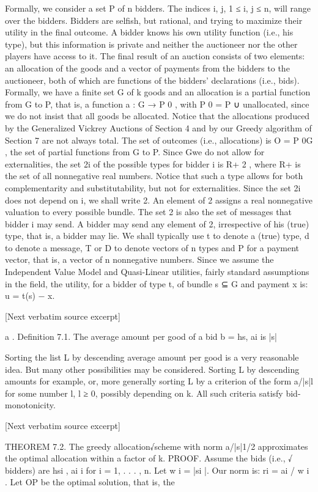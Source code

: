 \documentclass[10pt]{article}
\begin{document}
\begin{ReviewVerbatim}
Formally, we consider a set P of n bidders. The indices i, j, 1 ≤ i, j ≤ n, will
range over the bidders. Bidders are selfish, but rational, and trying to maximize their
utility in the final outcome. A bidder knows his own utility function (i.e., his type),
but this information is private and neither the auctioneer nor the other players have
access to it. The final result of an auction consists of two elements: an allocation
of the goods and a vector of payments from the bidders to the auctioneer, both of
which are functions of the bidders’ declarations (i.e., bids). Formally, we have a
finite set G of k goods and an allocation is a partial function from G to P, that is, a
function a : G → P 0 , with P 0 = P ∪ {unallocated}, since we do not insist that all
goods be allocated. Notice that the allocations produced by the Generalized Vickrey
Auctions of Section 4 and by our Greedy algorithm of Section 7 are not always
total. The set of outcomes (i.e., allocations) is O = P 0G , the set of partial functions
from G to P. Since Gwe do not allow for externalities, the set 2i of the possible types
for bidder i is R+ 2 , where R+ is the set of all nonnegative real numbers. Notice
that such a type allows for both complementarity and substitutability, but not for
externalities. Since the set 2i does not depend on i, we shall write 2. An element
of 2 assigns a real nonnegative valuation to every possible bundle. The set 2 is
also the set of messages that bidder i may send. A bidder may send any element of
2, irrespective of his (true) type, that is, a bidder may lie. We shall typically use t
to denote a (true) type, d to denote a message, T or D to denote vectors of n types
and P for a payment vector, that is, a vector of n nonnegative numbers.
Since we assume the Independent Value Model and Quasi-Linear utilities, fairly
standard assumptions in the field, the utility, for a bidder of type t, of bundle s ⊆ G
and payment x is:
u = t(s) − x.

[Next verbatim source excerpt]

a
.
Definition 7.1. The average amount per good of a bid b = hs, ai is |s|

Sorting the list L by descending average amount per good is a very reasonable idea. But many other possibilities may be considered. Sorting L by descending amounts for example, or, more generally sorting L by a criterion of the form
a/|s|l for some number l, l ≥ 0, possibly depending on k. All such criteria satisfy
bid-monotonicity.

[Next verbatim source excerpt]

THEOREM 7.2. The greedy allocation√scheme with norm a/|s|1/2 approximates
the optimal allocation within a factor of k.
PROOF. Assume the bids (i.e.,
√ bidders) are hsi , ai i for i = 1, . . . , n. Let
w i = |si |. Our norm is: ri = ai / w i . Let OP be the optimal solution, that is, the
\end{ReviewVerbatim}
\end{document}
